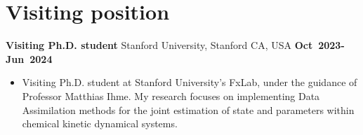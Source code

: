 \section{\sc Visiting position}

{\bf Visiting Ph.D. student} Stanford University, Stanford CA, USA \hfill
{\bf Oct~2023-Jun~2024}\\
\vspace*{-.1in}
\begin{itemize}
    \item[ ] Visiting Ph.D. student at Stanford University's FxLab, under the guidance of
       Professor Matthias Ihme. My research focuses on implementing Data Assimilation
       methods for the joint estimation of state and parameters within chemical kinetic
       dynamical systems.
\end{itemize}
